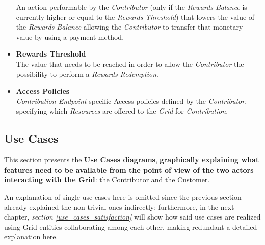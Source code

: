 \begin{itemize}
    An action performable by the \textit{Contributor} (only if the \textit{Rewards Balance} is currently higher or equal to the \textit{Rewards Threshold}) that lowers the value of the \textit{Rewards Balance} allowing the \textit{Contributor} to transfer that monetary value by using a payment method.
    \item \textbf{Rewards Threshold}\label{rewards_threshold}\\
    The value that needs to be reached in order to allow the \textit{Contributor} the possibility to perform a \textit{Rewards Redemption}.
    \item \textbf{Access Policies}\label{access_policies}\\
    \textit{Contribution Endpoint}-specific Access policies defined by the \textit{Contributor}, specifying which \textit{Resources} are offered to the \textit{Grid} for \textit{Contribution}.
\end{itemize}
\vspace{20mm}

\subsection{Use Cases}\label{use_cases}
This section presents the \textbf{Use Cases diagrams}, \textbf{graphically explaining what features need to be available from the point of view of the two actors interacting with the Grid}: the Contributor and the Customer.

An explanation of single use cases here is omitted since the previous section already explained the non-trivial ones indirectly; furthermore, in the next chapter, \textit{section \ref{use_cases_satisfaction}} will show how said use cases are realized using Grid entities collaborating among each other, making redundant a detailed explanation here.

